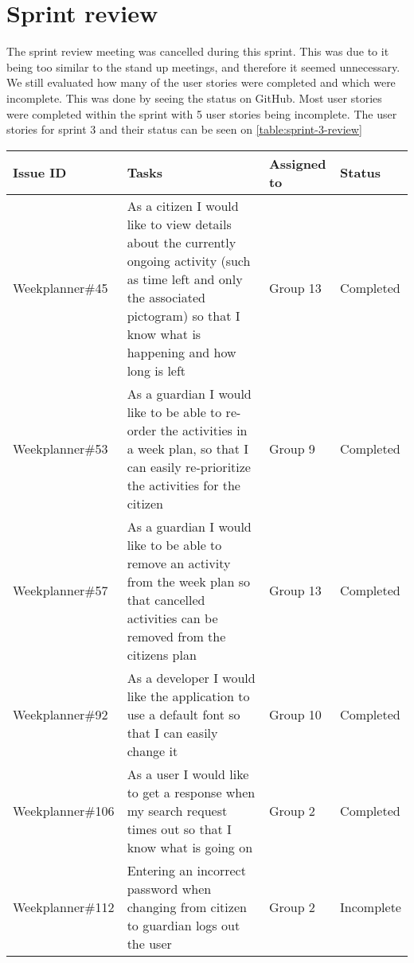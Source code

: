 \section{Sprint review}
The sprint review meeting was cancelled during this sprint. 
This was due to it being too similar to the stand up meetings, and therefore it seemed unnecessary. 
We still evaluated how many of the user stories were completed and which were incomplete.
This was done by seeing the status on GitHub.
Most user stories were completed within the sprint with 5 user stories being incomplete.    
The user stories for sprint 3 and their status can be seen on \autoref{table:sprint-3-review}
\begin{longtable}{|p{2.9cm}|p{8cm}|p{2cm}|p{2cm}|}
    \hline
    Issue ID        & Tasks                                                                                                                                                                                    & Assigned to  & Status   \\ \hline
    Weekplanner\#45 & As a citizen I would like to view details about the currently ongoing activity (such as time left and only the associated pictogram) so that I know what is happening and how long is left & Group 13   & Completed         \\ \hline
    Weekplanner\#53 & As a guardian I would like to be able to re-order the activities in a week plan, so that I can easily re-prioritize the activities for the citizen                                      & Group 9       & Completed         \\ \hline
    Weekplanner\#57 & As a guardian I would like to be able to remove an activity from the week plan so that cancelled activities can be removed from the citizens plan                                    & Group 13         & Completed         \\ \hline
    Weekplanner\#92 & As a developer I would like the application to use a default font so that I can easily change it                                                                                       & Group 10       & Completed     \\ \hline
    Weekplanner\#106 & As a user I would like to get a response when my search request times out so that I know what is going on                                                                             & Group 2        & Completed    \\ \hline
    Weekplanner\#112 & Entering an incorrect password when changing from citizen to guardian logs out the user                                                                                                  & Group 2     & Incomplete    \\ \hline

\end{longtable}
